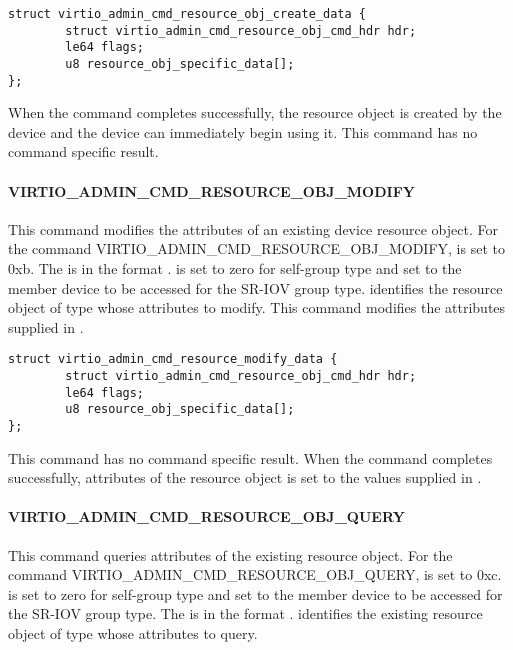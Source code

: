\begin{lstlisting}
struct virtio_admin_cmd_resource_obj_create_data {
        struct virtio_admin_cmd_resource_obj_cmd_hdr hdr;
        le64 flags;
        u8 resource_obj_specific_data[];
};
\end{lstlisting}

When the command completes successfully, the resource object is created by the
device and the device can immediately begin using it.
This command has no command specific result.

\paragraph{VIRTIO_ADMIN_CMD_RESOURCE_OBJ_MODIFY}
\label{par:Basic Facilities of a Virtio Device / Device groups / Group administration commands / Device resource objects / VIRTIO-ADMIN-CMD-RESOURCE-OBJ-MODIFY}

This command modifies the attributes of an existing device resource object.
For the command VIRTIO_ADMIN_CMD_RESOURCE_OBJ_MODIFY,  is set to 0xb.
The  is in the format
.
 is set to zero for self-group type and set to
the member device to be accessed for the SR-IOV group type.
 identifies the resource object of type  whose attributes
to modify.
This command modifies the attributes supplied in .

\begin{lstlisting}
struct virtio_admin_cmd_resource_modify_data {
        struct virtio_admin_cmd_resource_obj_cmd_hdr hdr;
        le64 flags;
        u8 resource_obj_specific_data[];
};
\end{lstlisting}

This command has no command specific result.
When the command completes successfully, attributes of the resource object is
set to the values supplied in .

\paragraph{VIRTIO_ADMIN_CMD_RESOURCE_OBJ_QUERY}
\label{par:Basic Facilities of a Virtio Device / Device groups / Group administration commands / Device resource objects / VIRTIO-ADMIN-CMD-RESOURCE-OBJ-QUERY}

This command queries attributes of the existing resource object.
For the command VIRTIO_ADMIN_CMD_RESOURCE_OBJ_QUERY,  is set to 0xc.
 is set to zero for self-group type and set to
the member device to be accessed for the SR-IOV group type.
The  is in the format
.
 identifies the existing resource object of type  whose
attributes to query.

